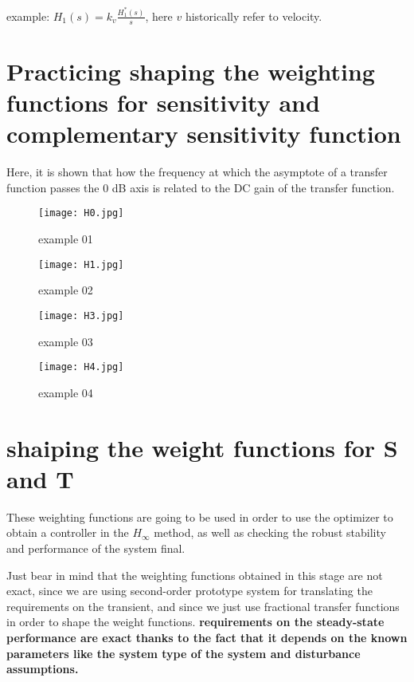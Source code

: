 \begin{factbox}
example:
\(
H_1(s) = k_v \frac{H_1^*(s)}{s}
\),
here $v$ historically refer to velocity.
\end{factbox}

\section{Practicing shaping the weighting functions for sensitivity and complementary sensitivity function}
\begin{factbox}
Here, it is shown that how the frequency at which the asymptote of a transfer function passes the 0 dB axis is related to the DC gain of the transfer function.
\begin{figure}[H]
    \centering
    \texttt{[image: H0.jpg]}
    \caption{example 01}
\end{figure}
\begin{figure}[H]
    \centering
    \texttt{[image: H1.jpg]}
    \caption{example 02}
\end{figure}
\end{factbox}

\begin{factbox}
\begin{figure}[H]
    \centering
    \texttt{[image: H3.jpg]}
    \caption{example 03}
\end{figure}
\begin{figure}[H]
    \centering
    \texttt{[image: H4.jpg]}
    \caption{example 04}
\end{figure}
\end{factbox}

\section{shaiping the weight functions for S and T}
These weighting functions are going to be used in order to use the optimizer to obtain a controller in the $H_\infty$ method, as well as checking the robust stability and performance of the system final.


Just bear in mind that the weighting functions obtained in this stage are not exact, since we are using second-order prototype system for translating the requirements on the transient, and since we just use fractional transfer functions in order to shape the weight functions. \textbf{requirements on the steady-state performance are exact thanks to the fact that it depends on the known parameters like the system type of the system and disturbance assumptions.}

